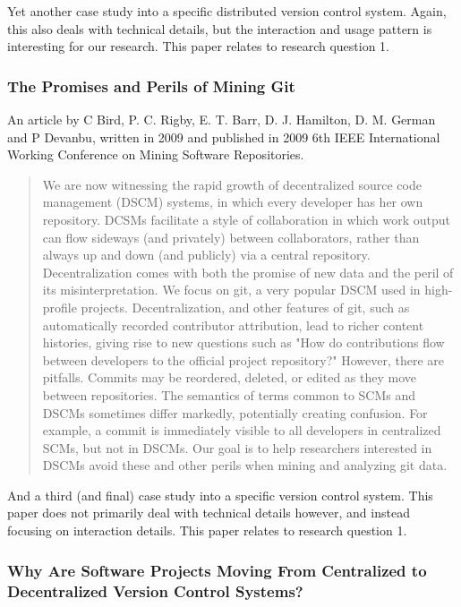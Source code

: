 \documentclass{llncs}
\begin{document}
Yet another case study into a specific distributed version control
system.  Again, this also deals with technical details, but the
interaction and usage pattern is interesting for our research. This
paper relates to research question 1.

\subsubsection{The Promises and Perils of Mining Git}

An article by C Bird, P. C. Rigby, E. T. Barr, D. J. Hamilton, D. M. German
and P Devanbu, written in 2009 and published in 2009 6th IEEE International 
Working Conference on Mining Software Repositories.

\begin{abstract}
 We are now witnessing the rapid growth of decentralized source code
 management (DSCM) systems, in which every developer has her own repository.
 DCSMs facilitate a style of collaboration in which work output can flow
 sideways (and privately) between collaborators, rather than always up and
 down (and publicly) via a central repository. Decentralization comes with
 both the promise of new data and the peril of its misinterpretation. We
 focus on git, a very popular DSCM used in high-profile projects.
 Decentralization, and other features of git, such as automatically recorded
 contributor attribution, lead to richer content histories, giving rise to
 new questions such as "How do contributions flow between developers to the
 official project repository?" However, there are pitfalls. Commits may be
 reordered, deleted, or edited as they move between repositories. The
 semantics of terms common to SCMs and DSCMs sometimes differ markedly,
 potentially creating confusion. For example, a commit is immediately
 visible to all developers in centralized SCMs, but not in DSCMs. Our goal
 is to help researchers interested in DSCMs avoid these and other perils
 when mining and analyzing git data.
\end{abstract}

And a third (and final) case study into a specific version control
system.  This paper does not primarily deal with technical details
however, and instead focusing on interaction details. This paper
relates to research question 1.

\subsubsection{Why Are Software Projects Moving From Centralized to
               Decentralized Version Control Systems?}
\end{document}
